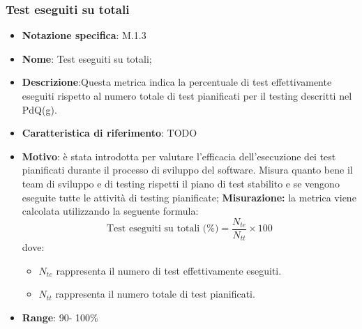 \subsubsection{Test eseguiti su totali}
\begin{itemize}
    \item \textbf{Notazione specifica}: M.1.3
    \item \textbf{Nome}: Test eseguiti su totali;
    \item \textbf{Descrizione}:Questa metrica indica la percentuale di test effettivamente eseguiti rispetto al numero totale di test pianificati per il testing descritti nel PdQ(g). 
    \item \textbf{Caratteristica di riferimento}: TODO
    \item \textbf{Motivo}: è stata introdotta per valutare l'efficacia dell'esecuzione dei test pianificati durante il processo di sviluppo del software. Misura quanto bene il team di sviluppo e di testing rispetti il piano di test stabilito e se vengono eseguite tutte le attività di testing pianificate;
    \textbf{Misurazione:} la metrica viene calcolata utilizzando la seguente formula:
        \[
        \text{Test eseguiti su totali (\%)} = \frac{N_{te}}{N_{tt}} \times 100
        \]
        dove:
        \begin{itemize}
            \item $N_{te}$ rappresenta il numero di test effettivamente eseguiti.
            \item $N_{tt}$ rappresenta il numero totale di test pianificati.
        \end{itemize}
    \item \textbf{Range}: 90- 100\%
\end{itemize}